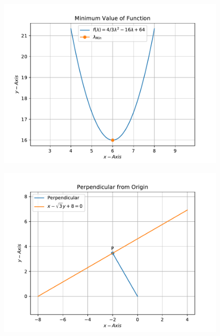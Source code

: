 \documentclass[12pt]{article}
\begin{document}
\begin{enumerate}
\begin{figure}[!h]
\begin{center}
		\includegraphics[width=\columnwidth]{figs/problem3.1a.pdf}
	\end{center}
\caption{}
\label{fig:Fig1}
\end{figure}
\begin{figure}[!h]
	\begin{center}
		\includegraphics[width=\columnwidth]{figs/problem3.1b.pdf}
	\end{center}
\caption{}
\label{fig:Fig2}
\end{figure}
\end{enumerate}
\end{document}
